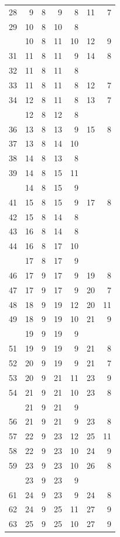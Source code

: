 \begin{Schunk}
\begin{longtable}{rrrrrrr}
28 & 9 & 8 & 9 & 8 & 11 & 7\\
29 & 10 & 8 & 10 & 8 &  & \\
\addlinespace
30 & 10 & 8 & 11 & 10 & 12 & 9\\
31 & 11 & 8 & 11 & 9 & 14 & 8\\
32 & 11 & 8 & 11 & 8 &  & \\
33 & 11 & 8 & 11 & 8 & 12 & 7\\
34 & 12 & 8 & 11 & 8 & 13 & 7\\
\addlinespace
35 & 12 & 8 & 12 & 8 &  & \\
36 & 13 & 8 & 13 & 9 & 15 & 8\\
37 & 13 & 8 & 14 & 10 &  & \\
38 & 14 & 8 & 13 & 8 &  & \\
39 & 14 & 8 & 15 & 11 &  & \\
\addlinespace
40 & 14 & 8 & 15 & 9 &  & \\
41 & 15 & 8 & 15 & 9 & 17 & 8\\
42 & 15 & 8 & 14 & 8 &  & \\
43 & 16 & 8 & 14 & 8 &  & \\
44 & 16 & 8 & 17 & 10 &  & \\
\addlinespace
45 & 17 & 8 & 17 & 9 &  & \\
46 & 17 & 9 & 17 & 9 & 19 & 8\\
47 & 17 & 9 & 17 & 9 & 20 & 7\\
48 & 18 & 9 & 19 & 12 & 20 & 11\\
49 & 18 & 9 & 19 & 10 & 21 & 9\\
\addlinespace
50 & 19 & 9 & 19 & 9 &  & \\
51 & 19 & 9 & 19 & 9 & 21 & 8\\
52 & 20 & 9 & 19 & 9 & 21 & 7\\
53 & 20 & 9 & 21 & 11 & 23 & 9\\
54 & 21 & 9 & 21 & 10 & 23 & 8\\
\addlinespace
55 & 21 & 9 & 21 & 9 &  & \\
56 & 21 & 9 & 21 & 9 & 23 & 8\\
57 & 22 & 9 & 23 & 12 & 25 & 11\\
58 & 22 & 9 & 23 & 10 & 24 & 9\\
59 & 23 & 9 & 23 & 10 & 26 & 8\\
\addlinespace
60 & 23 & 9 & 23 & 9 &  & \\
61 & 24 & 9 & 23 & 9 & 24 & 8\\
62 & 24 & 9 & 25 & 11 & 27 & 9\\
63 & 25 & 9 & 25 & 10 & 27 & 9\\

\end{longtable}
\end{Schunk}
